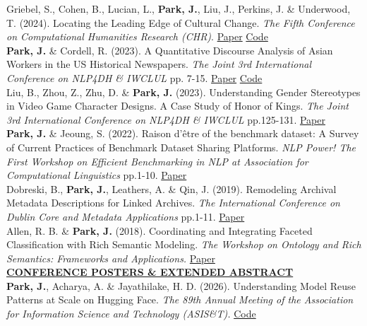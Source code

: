 \documentclass{article}
\begin{document}
\noindent Griebel, S., Cohen, B., Lucian, L., \textbf{Park, J.}, Liu, J., Perkins, J. \& Underwood, T. (2024). Locating the Leading Edge of Cultural Change. \textit{The Fifth Conference on Computational Humanities Research (CHR)}. \hfill \href{https://arxiv.org/pdf/2411.15068}{Paper} \href{https://github.com/IllinoisLiteraryLab/novelty}{Code} \\

\noindent \textbf{Park, J.} \& Cordell, R. (2023). A Quantitative Discourse Analysis of Asian Workers in the US Historical Newspapers. \textit{The Joint 3rd International Conference on NLP4DH \& IWCLUL} pp. 7-15. \hfill \href{https://aclanthology.org/2023.nlp4dh-1.2/}{Paper} \href{https://github.com/park-jay/coolie}{Code}\\

\noindent Liu, B., Zhou, Z., Zhu, D. \& \textbf{Park, J.} (2023). Understanding Gender Stereotypes in Video Game Character Designs. A Case Study of Honor of Kings. \textit{The Joint 3rd International Conference on NLP4DH \& IWCLUL} pp.125-131. \hfill \href{https://arxiv.org/pdf/2311.14226}{Paper} \\

\noindent \textbf{Park, J.} \& Jeoung, S. (2022). Raison d'être of the benchmark dataset: A Survey of Current Practices of Benchmark Dataset Sharing Platforms. \textit{NLP Power! The First Workshop on Efficient Benchmarking in NLP at Association for Computational Linguistics} pp.1-10. \hfill \href{https://aclanthology.org/2022.nlppower-1.1/}{Paper} \\

\noindent Dobreski, B., \textbf{Park, J.}, Leathers, A. \& Qin, J. (2019). Remodeling Archival Metadata Descriptions for Linked Archives. \textit{The International Conference on Dublin Core and Metadata Applications} pp.1-11. \hfill \href{https://dcpapers.dublincore.org/article/952141553}{Paper} \\ 

\noindent Allen, R. B. \& \textbf{Park, J.} (2018). Coordinating and Integrating Faceted Classification with Rich Semantic Modeling. \textit{The Workshop on Ontology and Rich Semantics: Frameworks and Applications.} \hfill \href{https://arxiv.org/abs/1809.09548}{Paper} \\

\noindent \textbf{\underline{CONFERENCE POSTERS \& EXTENDED ABSTRACT}} \\
\noindent \textbf{Park, J.}, Acharya, A. \& Jayathilake, H. D. (2026). Understanding Model Reuse Patterns at Scale on Hugging Face. \textit{The 89th Annual Meeting of the Association for Information Science and Technology (ASIS\&T).} \hfill \href{https://github.com/park-jay/huggingface-reuse}{Code} \\
\end{document}
